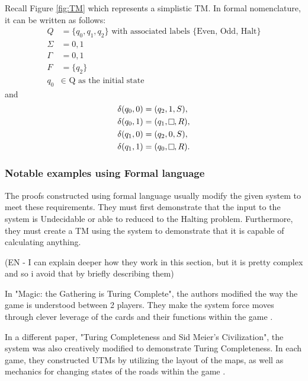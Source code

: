 Recall Figure \ref{fig:TM} which represents a simplistic TM.
In formal nomenclature, it can be written as follows:
\[
    \begin{aligned}
        Q &= \{q_{0}, q_{1}, q_{2}\} \text{ with associated labels \{Even, Odd, Halt\}}\\
        \Sigma &= {0,1}\\
        \Gamma &= {0,1}\\
        F &= \{q_{2}\}\\
        q_{0} &\in \text{ Q as the initial state}
    \end{aligned}
\]
and
\[
    \begin{aligned}
        \delta (q_{0}, 0) &= (q_{2}, 1, S),\\
        \delta (q_{0}, 1) &= (q_{1}, \raisebox{0.1cm}{\fbox{}}, R),\\
        \delta (q_{1}, 0) &= (q_{2}, 0, S),\\
        \delta (q_{1}, 1) &= (q_{0}, \raisebox{0.1cm}{\fbox{}}, R).\\
    \end{aligned}
\]

\subsubsection{Notable examples using Formal language}\label{subsubsec:NotableEgsFormalLang}

The proofs constructed using formal language usually modify the given system to meet these requirements.
They must first demonstrate that the input to the system is Undecidable or able to reduced to the Halting problem.
Furthermore, they must create a TM using the system to demonstrate that it is capable of calculating anything.

(EN - I can explain deeper how they work in this section, but it is pretty complex and so i avoid that by briefly describing them)

In "Magic: the Gathering is Turing Complete", the authors modified the way the game is understood between 2 players.
They make the system force moves through clever leverage of the cards and their functions within the game \cite{MtGTC}.

In a different paper, "Turing Completeness and Sid Meier's Civilization", the system was also creatively modified to demonstrate Turing Completeness.
In each game, they constructed UTMs by utilizing the layout of the maps, as well as mechanics for changing states of the roads within the game \cite{CivTC}.

